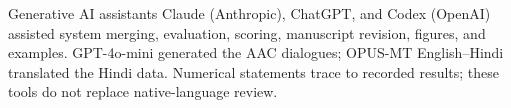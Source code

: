Generative AI assistants Claude (Anthropic), ChatGPT, and Codex (OpenAI) assisted system merging, evaluation, scoring, manuscript revision, figures, and examples.
GPT-4o-mini generated the AAC dialogues; OPUS-MT English--Hindi translated the Hindi data.
Numerical statements trace to recorded results; these tools do not replace native-language review.
